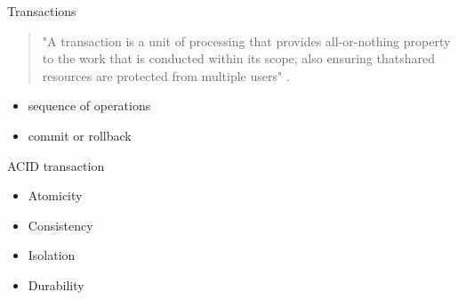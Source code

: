 \documentclass{beamer}
\begin{document}
    \begin{frame}{Transactions}
    
     \begin{quotation}
         \begin{center}
             "A transaction is a unit of processing that provides all-or-nothing property to the work that is conducted within its scope, also ensuring thatshared resources are protected from multiple users" \cite{java_transaction_processing}.
         \end{center}
     \end{quotation}
     \Large
        \begin{itemize}
            \item sequence of operations
            \item commit or rollback
        \end{itemize}
        \hfill \break
        \hfill \break
        
    \end{frame}
    
\begin{frame}{ACID transaction}

    \Large
    \begin{itemize}
        \item Atomicity
        \item Consistency
        \item Isolation
        \item Durability
    \end{itemize}
    \hfill \break
    \hfill \break
    \hfill \break

\end{frame}
\end{document}
